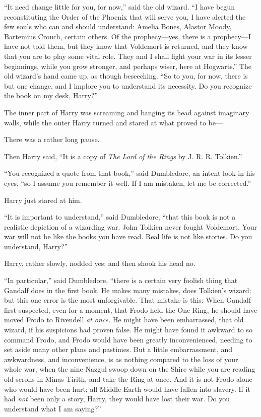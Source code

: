 “It need change little for you, for now,” said the old wizard. “I have begun reconstituting the Order of the Phoenix that will serve you, I have alerted the few souls who can and should understand: Amelia Bones, Alastor Moody, Bartemius Crouch, certain others. Of the prophecy—yes, there is a prophecy—I have not told them, but they know that Voldemort is returned, and they know that you are to play some vital role. They and I shall fight your war in its lesser beginnings, while you grow stronger, and perhaps wiser, here at Hogwarts.” The old wizard’s hand came up, as though beseeching. “So to you, for now, there is but one change, and I implore you to understand its necessity. Do you recognize the book on my desk, Harry?”

The inner part of Harry was screaming and banging its head against imaginary walls, while the outer Harry turned and stared at what proved to be—

There was a rather long pause.

Then Harry said, “It is a copy of \emph{The Lord of the Rings} by J. R. R. Tolkien.”

“You recognized a quote from that book,” said Dumbledore, an intent look in his eyes, “so I assume you remember it well. If I am mistaken, let me be corrected.”

Harry just stared at him.

“It is important to understand,” said Dumbledore, “that this book is not a realistic depiction of a wizarding war. John Tolkien never fought Voldemort. Your war will not be like the books you have read. Real life is not like stories. Do you understand, Harry?”

Harry, rather slowly, nodded yes; and then shook his head no.

“In particular,” said Dumbledore, “there is a certain very foolish thing that Gandalf does in the first book. He makes many mistakes, does Tolkien’s wizard; but this one error is the most unforgivable. That mistake is this: When Gandalf first suspected, even for a moment, that Frodo held the One Ring, he should have moved Frodo to Rivendell \emph{at once.} He might have been embarrassed, that old wizard, if his suspicions had proven false. He might have found it awkward to so command Frodo, and Frodo would have been greatly inconvenienced, needing to set aside many other plans and pastimes. But a little embarrassment, and awkwardness, and inconvenience, is as nothing compared to the loss of your whole war, when the nine Nazgul swoop down on the Shire while you are reading old scrolls in Minas Tirith, and take the Ring at once. And it is not Frodo alone who would have been hurt; all Middle-Earth would have fallen into slavery. If it had \emph{not} been only a story, Harry, they would have lost their war. Do you understand what I am saying?”

